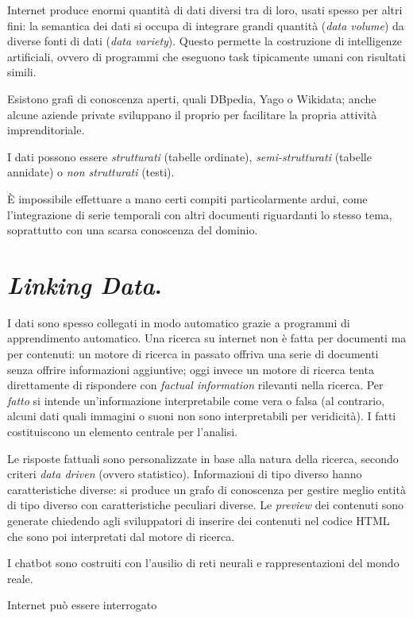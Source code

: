 \documentclass[11pt]{article}
\begin{document}
\begin{multicols}{2}
Internet produce enormi quantità di dati diversi tra di loro, usati spesso per altri fini: la semantica dei dati si occupa di integrare grandi quantità (\textit{data volume}) da diverse fonti di dati (\textit{data variety}).
Questo permette la costruzione di intelligenze artificiali, ovvero di programmi che eseguono task tipicamente umani con risultati simili.

Esistono grafi di conoscenza aperti, quali DBpedia, Yago o Wikidata; anche alcune aziende private sviluppano il proprio per facilitare la propria attività imprenditoriale.

I dati possono essere \textit{strutturati} (tabelle ordinate), \textit{semi-strutturati} (tabelle annidate) o \textit{non strutturati} (testi).

È impossibile effettuare a mano certi compiti particolarmente ardui, come l'integrazione di serie temporali con altri documenti riguardanti lo stesso tema, soprattutto con una scarsa conoscenza del dominio.

\section{\textit{Linking Data}.}
I dati sono spesso collegati in modo automatico grazie a programmi di apprendimento automatico.
Una ricerca su internet non è fatta per documenti ma per contenuti: un motore di ricerca in passato offriva una serie di documenti senza offrire informazioni aggiuntive; oggi invece un motore di ricerca tenta direttamente di rispondere con \textit{factual information} rilevanti nella ricerca.
Per \textit{fatto} si intende un'informazione interpretabile come vera o falsa (al contrario, alcuni dati quali immagini o suoni non sono interpretabili per veridicità).
I fatti costituiscono un elemento centrale per l'analisi.

Le risposte fattuali sono personalizzate in base alla natura della ricerca, secondo criteri \textit{data driven} (ovvero statistico).
Informazioni di tipo diverso hanno caratteristiche diverse: si produce un grafo di conoscenza per gestire meglio entità di tipo diverso con caratteristiche peculiari diverse.
Le \textit{preview} dei contenuti sono generate chiedendo agli sviluppatori di inserire dei contenuti nel codice HTML che sono poi interpretati dal motore di ricerca.

I chatbot sono costruiti con l'ausilio di reti neurali e rappresentazioni del mondo reale.

Internet può essere interrogato


\end{multicols}
\end{document}
